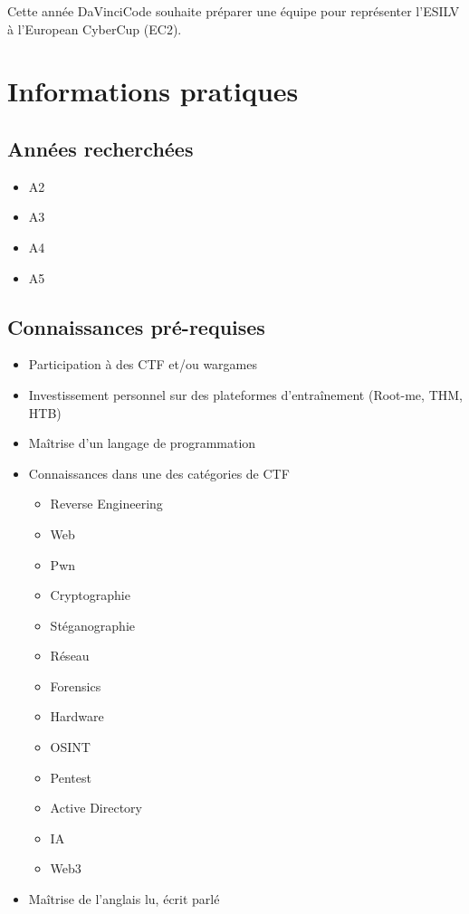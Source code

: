 \documentclass[12pt]{article}
\begin{document}
    Cette année DaVinciCode souhaite préparer une équipe pour représenter l'ESILV à l'European CyberCup (EC2).

	\section{Informations pratiques}
	\subsection{Années recherchées}
	\begin{itemize}
		\item A2
		\item A3
		\item A4
		\item A5
	\end{itemize}

    \subsection{Connaissances pré-requises}
	\begin{itemize}
		\item Participation à des CTF et/ou wargames 
        \item Investissement personnel sur des plateformes d'entraînement (Root-me, THM, HTB)
		\item Maîtrise d'un langage de programmation
        \item Connaissances dans une des catégories de CTF 
		\begin{itemize}
			\item Reverse Engineering
			\item Web
			\item Pwn
			\item Cryptographie
			\item Stéganographie
            \item Réseau
            \item Forensics
            \item Hardware
            \item OSINT
            \item Pentest
            \item Active Directory
            \item IA
			\item Web3
		\end{itemize}
		\item Maîtrise de l'anglais lu, écrit parlé
	\end{itemize}
	
\end{document}
